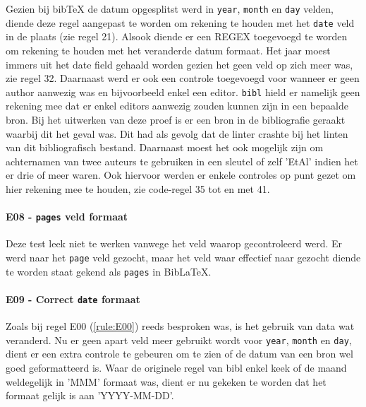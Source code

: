 Gezien bij bibTeX de datum opgesplitst werd in \texttt{year}, \texttt{month} en \texttt{day} velden, diende deze regel aangepast te worden om rekening te houden met het \texttt{date} veld in de plaats (zie regel 21). Alsook diende er een \acrfull{REGEX} toegevoegd te worden om rekening te houden met het veranderde datum formaat. Het jaar moest immers uit het date field gehaald worden gezien het geen veld op zich meer was, zie regel 32. Daarnaast werd er ook een controle toegevoegd voor wanneer er geen author aanwezig was en bijvoorbeeld enkel een editor. \texttt{bibl} hield er namelijk geen rekening mee dat er enkel editors aanwezig zouden kunnen zijn in een bepaalde bron. Bij het uitwerken van deze proef is er een bron in de bibliografie geraakt waarbij dit het geval was. Dit had als gevolg dat de linter crashte bij het linten van dit bibliografisch bestand.
Daarnaast moest het ook mogelijk zijn om achternamen van twee auteurs te gebruiken in een sleutel of zelf 'EtAl' indien het er drie of meer waren. Ook hiervoor werden er enkele controles op punt gezet om hier rekening mee te houden, zie code-regel 35 tot en met 41.

\paragraph{E08 - \texttt{pages} veld formaat}
Deze test leek niet te werken vanwege het veld waarop gecontroleerd werd. Er werd naar het \texttt{page} veld gezocht, maar het veld waar effectief naar gezocht diende te worden staat gekend als \texttt{pages} in BibLaTeX. 

\paragraph{E09 - Correct \texttt{date} formaat}
Zoals bij regel E00 (\ref{rule:E00}) reeds besproken was, is het gebruik van data wat veranderd. Nu er geen apart veld meer gebruikt wordt voor \texttt{year}, \texttt{month} en \texttt{day}, dient er een extra controle te gebeuren om te zien of de datum van een bron wel goed geformatteerd is. Waar de originele regel van bibl enkel keek of de maand weldegelijk in 'MMM' formaat was, dient er nu gekeken te worden dat het formaat gelijk is aan 'YYYY-MM-DD'. 


